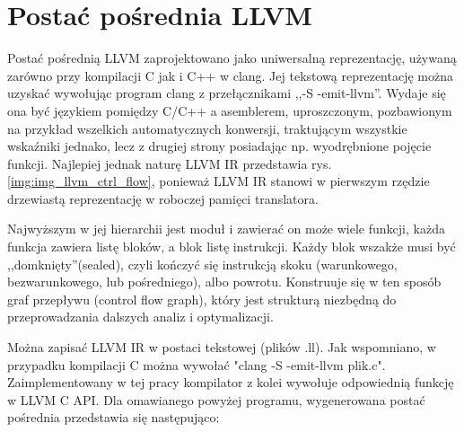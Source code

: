 \section{Postać pośrednia LLVM}
Postać pośrednią LLVM zaprojektowano jako uniwersalną reprezentację, używaną zarówno przy kompilacji C jak i C++ w clang. Jej tekstową reprezentację można uzyskać wywołując program clang z przełącznikami ,,-S -emit-llvm''. Wydaje się ona być językiem pomiędzy C/C++ a asemblerem, uproszczonym, pozbawionym na przykład wszelkich automatycznych konwersji, traktującym wszystkie wskaźniki jednako, lecz z drugiej strony posiadając np. wyodrębnione pojęcie funkcji. Najlepiej jednak naturę LLVM IR przedstawia rys.\ref{img:img_llvm_ctrl_flow}, ponieważ LLVM IR stanowi w pierwszym rzędzie drzewiastą reprezentację w roboczej pamięci translatora.

Najwyższym w jej hierarchii jest moduł i zawierać on może wiele funkcji, każda funkcja zawiera listę bloków, a blok listę instrukcji. Każdy blok wszakże musi być ,,domknięty''(sealed), czyli kończyć się instrukcją skoku (warunkowego, bezwarunkowego, lub pośredniego), albo powrotu. Konstruuje się w ten sposób graf przepływu (control flow graph), który jest strukturą niezbędną do przeprowadzania dalszych analiz i optymalizacji\cite{llvm_lang_ref}.

Można zapisać LLVM IR w postaci tekstowej (plików .ll). Jak wspomniano, w przypadku kompilacji C można wywołać "clang -S -emit-llvm plik.c". Zaimplementowany w tej pracy kompilator z kolei wywołuje odpowiednią funkcję w LLVM C API. Dla omawianego powyżej programu, wygenerowana postać pośrednia przedstawia się następująco:

